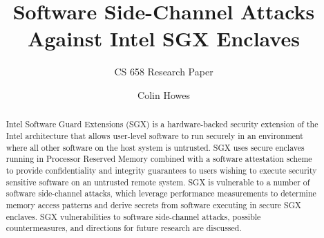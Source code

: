 \documentclass[sigconf]{acmart}
\begin{document}
\title{Software Side-Channel Attacks Against Intel SGX Enclaves}
\subtitle{CS 658 Research Paper}


\author{Colin Howes}

\begin{abstract}

Intel Software Guard Extensions (SGX) is a hardware-backed security extension of the Intel architecture that allows user-level software to run securely in an environment where all other software on the host system is untrusted. SGX uses secure enclaves running in Processor Reserved Memory combined with a software attestation scheme to provide confidentiality and integrity guarantees to users wishing to execute security sensitive software on an untrusted remote system. SGX is vulnerable to a number of software side-channel attacks, which leverage performance measurements to determine memory access patterns and derive secrets from software executing in secure SGX enclaves. SGX vulnerabilities to software side-channel attacks, possible countermeasures, and directions for future research are discussed.

\end{abstract}

\maketitle




 
\end{document}

